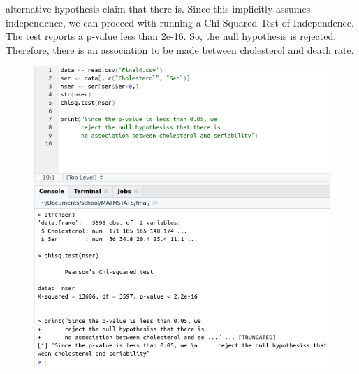 \documentclass[12pt]{article}
\begin{document}
\begin{enumerate}
		alternative hypothesis claim that there is. Since this implicitly assumes independence, we can proceed 
		with running a Chi-Squared Test of Independence. The test reports a p-value less than 2e-16. So, the null 
		hypothesis is rejected. Therefore, there is an association to be made between cholesterol and death rate.
	\begin{figure}[!h]
		\centering
		\includegraphics[width=\linewidth]{p5-p.png}
	\end{figure}
\end{enumerate}
\end{document}
